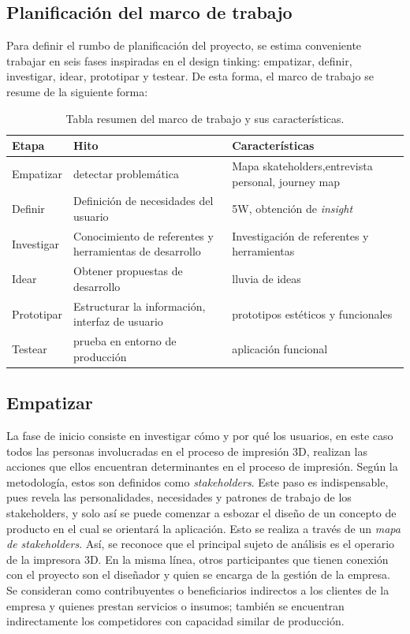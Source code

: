 \subsection{Planificación del marco de trabajo}

Para definir el rumbo de planificación del proyecto, se estima conveniente trabajar en seis fases inspiradas en el design tinking: empatizar, definir, investigar, idear, prototipar y testear. De esta forma, el marco de trabajo se resume de la siguiente forma:

\begin{table}[H]
\centering
\begin{tabular}{|p{3.5cm}|p{3.5cm}|p{3.5cm}|}
\hline
Etapa & Hito & Características \\
\hline
Empatizar & detectar problemática & Mapa skateholders,entrevista personal, journey map \\
\hline
Definir & Definición de necesidades del usuario & 5W, obtención de \textit{insight}\\
\hline
Investigar & Conocimiento de referentes y herramientas de desarrollo & Investigación de referentes y herramientas \\
\hline
Idear & Obtener propuestas de desarrollo & lluvia de ideas \\
\hline
Prototipar & Estructurar la información, interfaz de usuario & prototipos estéticos y funcionales \\
\hline
Testear & prueba en entorno de producción & aplicación funcional \\
\hline

\end{tabular}
\caption{Tabla resumen del marco de trabajo y sus características.}
\end{table}

\subsection{Empatizar}

La fase de inicio consiste en investigar cómo y por qué los usuarios, en este caso todos las personas involucradas en el proceso de impresión 3D, realizan las acciones que ellos encuentran determinantes en el proceso de impresión. Según la metodología, estos son definidos como \textit{stakeholders}. Este paso es indispensable, pues revela las personalidades, necesidades y patrones de trabajo de los stakeholders, y solo así se puede comenzar a esbozar el diseño de un concepto de producto en el cual se orientará la aplicación. Esto se realiza a través de un \textit{mapa de stakeholders}. Así, se reconoce que el principal sujeto de análisis es el operario de la impresora 3D. En la misma línea, otros participantes que tienen conexión con el proyecto son el diseñador y quien se encarga de la gestión de la empresa. Se consideran como contribuyentes o beneficiarios indirectos a los clientes de la empresa y quienes prestan servicios o insumos; también se encuentran indirectamente los competidores con capacidad similar de producción.

